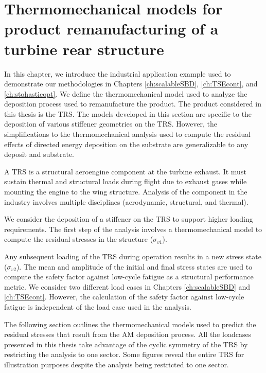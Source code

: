 \chapter{Thermomechanical models for product remanufacturing of a turbine rear structure}
\label{ch:thermomechanical}

In this chapter, we introduce the industrial application example used to demonstrate our methodologies in Chapters \ref{ch:scalableSBD}, \ref{ch:TSEcont}, and \ref{ch:stohasticopt}. We define the thermomechanical model used to analyze the deposition process used to remanufacture the product. The product considered in this thesis is the \ac{TRS}. The models developed in this section are specific to the deposition of various stiffener geometries on the \acf{TRS}. However, the simplifications to the thermomechanical analysis used to compute the residual effects of directed energy deposition on the substrate are generalizable to any deposit and substrate.

A \ac{TRS} is a structural aeroengine component at the turbine exhaust. It must sustain thermal and structural loads during flight due to exhaust gases while mounting the engine to the wing structure. Analysis of the component in the industry involves multiple disciplines (aerodynamic, structural, and thermal). 

We consider the deposition of a stiffener on the \ac{TRS} to support higher loading requirements. The first step of the analysis involves a thermomechanical model to compute the residual stresses in the structure ($\sigma_{v1}$). 

Any subsequent loading of the \ac{TRS} during operation results in a new stress state ($\sigma_{v2}$). The mean and amplitude of the initial and final stress states are used to compute the safety factor against low-cycle fatigue as a structural performance metric. We consider two different load cases in Chapters \ref{ch:scalableSBD} and \ref{ch:TSEcont}. However, the calculation of the safety factor against low-cycle fatigue is independent of the load case used in the analysis.

The following section outlines the thermomechanical models used to predict the residual stresses that result from the \ac{AM} deposition process. All the loadcases presented in this thesis take advantage of the cyclic symmetry of the \ac{TRS} by restricting the analysis to one sector. Some figures reveal the entire \ac{TRS} for illustration purposes despite the analysis being restricted to one sector.

